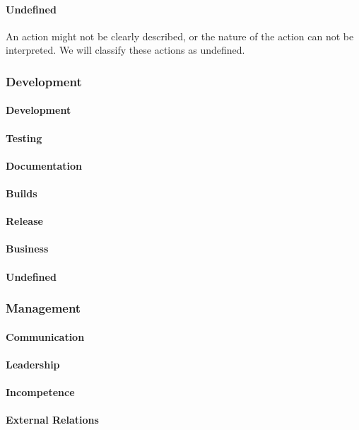 \paragraph{Undefined}
An action might not be clearly described, or the nature of the action can not be interpreted. We will classify these actions as undefined.
\subsubsection{Development}
\paragraph{Development}
\paragraph{Testing}
\paragraph{Documentation}
\paragraph{Builds}
\paragraph{Release}
\paragraph{Business}
\paragraph{Undefined}
\subsubsection{Management}
\paragraph{Communication}
\paragraph{Leadership}
\paragraph{Incompetence}
\paragraph{External Relations}
